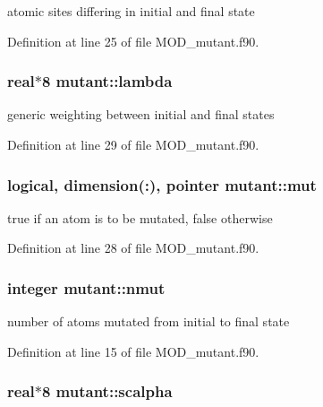 atomic sites differing in initial and final state 



Definition at line 25 of file M\-O\-D\-\_\-mutant.\-f90.

\hypertarget{classmutant_adee687e0840c070a419397c427a8af9a}{
\subsubsection[{lambda}]{\setlength{\rightskip}{0pt plus 5cm}real$\ast$8 mutant\-::lambda}}\label{classmutant_adee687e0840c070a419397c427a8af9a}


generic weighting between initial and final states 



Definition at line 29 of file M\-O\-D\-\_\-mutant.\-f90.

\hypertarget{classmutant_ae0c38ddd61deb335a7d9e16315c7e4c7}{
\subsubsection[{mut}]{\setlength{\rightskip}{0pt plus 5cm}logical, dimension(\-:), pointer mutant\-::mut}}\label{classmutant_ae0c38ddd61deb335a7d9e16315c7e4c7}


true if an atom is to be mutated, false otherwise 



Definition at line 28 of file M\-O\-D\-\_\-mutant.\-f90.

\hypertarget{classmutant_a3d601d8dbb74b427005f7a8ffade0b8b}{
\subsubsection[{nmut}]{\setlength{\rightskip}{0pt plus 5cm}integer mutant\-::nmut}}\label{classmutant_a3d601d8dbb74b427005f7a8ffade0b8b}


number of atoms mutated from initial to final state 



Definition at line 15 of file M\-O\-D\-\_\-mutant.\-f90.

\hypertarget{classmutant_abad0ffe3a5429d56f8ea16467ad1268d}{
\subsubsection[{scalpha}]{\setlength{\rightskip}{0pt plus 5cm}real$\ast$8 mutant\-::scalpha}}\label{classmutant_abad0ffe3a5429d56f8ea16467ad1268d}


